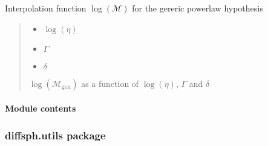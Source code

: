 \documentclass[letterpaper,10pt,english]{sphinxmanual}
\begin{document}
\begin{fulllineitems}
\label{\detokenize{diffsph.spectra:diffsph.spectra.synchrotron.lMst_pw}}
\pysigstartsignatures
{}
\pysigstopsignatures
\sphinxAtStartPar
Interpolation function \(\log(\mathcal M)\) for the gereric power\sphinxhyphen{}law hypothesis
\begin{quote}\begin{description}
\begin{itemize}
\item {} 
\sphinxAtStartPar
{} \textendash{} \(\log(\eta)\)

\item {} 
\sphinxAtStartPar
{} \textendash{} \(\Gamma\)

\item {} 
\sphinxAtStartPar
{} \textendash{} \(\delta\)

\end{itemize}

\sphinxAtStartPar
\(\log(\mathcal M_\text{gen})\) as a function of \(\log(\eta)\), \(\Gamma\) and \(\delta\)

\end{description}\end{quote}

\end{fulllineitems}



\paragraph{Module contents}
\label{\detokenize{diffsph.spectra:module-diffsph.spectra}}\label{\detokenize{diffsph.spectra:module-contents}}
\sphinxstepscope


\subsubsection{diffsph.utils package}
\label{\detokenize{diffsph.utils:diffsph-utils-package}}\label{\detokenize{diffsph.utils::doc}}
\end{document}
